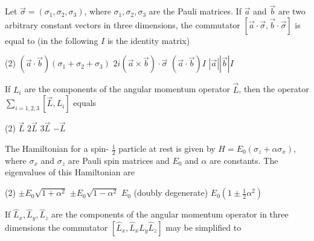 \begin{enumerate}
\begin{tasks}
\end{tasks}
\begin{minipage}{\textwidth}
	\item Let $\vec{\sigma}=\left(\sigma_{1}, \sigma_{2}, \sigma_{3}\right)$, where $\sigma_{1}, \sigma_{2}, \sigma_{3}$ are the Pauli matrices. If $\vec{a}$ and $\vec{b}$ are two arbitrary constant vectors in three dimensions, the commutator $[\vec{a} \cdot \vec{\sigma}, \vec{b} \cdot \vec{\sigma}]$ is equal to (in the following $I$ is the identity matrix)
\end{minipage}
\begin{tasks}(2)
	\task[\textbf{A.}] $(\vec{a} \cdot \vec{b})\left(\sigma_{1}+\sigma_{2}+\sigma_{3}\right)$
	\task[\textbf{B.}]$2 i(\vec{a} \times \vec{b}) \cdot \vec{\sigma}$
	\task[\textbf{C.}]$(\vec{a} \cdot \vec{b}) I$
	\task[\textbf{D.}]$|\vec{a}||\vec{b}| I$
\end{tasks}
\begin{minipage}{\textwidth}
	\item If $L_{i}$ are the components of the angular momentum operator $\vec{L}$, then the operator $\sum_{i=1,2,3}\left[\vec{L}, L_{i}\right]$ equals
\end{minipage}
\begin{tasks}(2)
	\task[\textbf{A.}] $\vec{L}$
	\task[\textbf{B.}]$2 \vec{L}$
	\task[\textbf{C.}]$3 \vec{L}$
	\task[\textbf{D.}]$-\vec{L}$
\end{tasks}
\begin{minipage}{\textwidth}
	\item The Hamiltonian for a spin- $\frac{1}{2}$ particle at rest is given by $H=E_{0}\left(\sigma_{z}+\alpha \sigma_{x}\right)$, where $\sigma_{x}$ and $\sigma_{z}$ are Pauli spin matrices and $E_{0}$ and $\alpha$ are constants. The eigenvalues of this Hamiltonian are
\end{minipage}
\begin{tasks}(2)
	\task[\textbf{A.}] $\pm E_{0} \sqrt{1+\alpha^{2}}$
	\task[\textbf{B.}]$\pm E_{0} \sqrt{1-\alpha^{2}}$
	\task[\textbf{C.}]$E_{0}$ (doubly degenerate)
	\task[\textbf{D.}]$E_{0}\left(1 \pm \frac{1}{2} \alpha^{2}\right)$
\end{tasks}
\begin{minipage}{\textwidth}
	\item If $\hat{L}_{x}, \hat{L}_{y}, \hat{L}_{z}$ are the components of the angular momentum operator in three dimensions the commutator $\left[\hat{L}_{x}, \hat{L}_{x} \hat{L}_{y} \hat{L}_{z}\right]$ may be simplified to

\end{minipage}
\end{enumerate}
